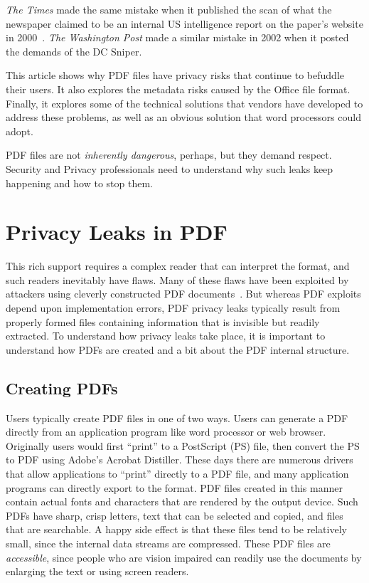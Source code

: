 \emph{The Times}  made the
same mistake when it published the scan of what the newspaper claimed
to be an internal US intelligence report on the paper's website in
2000~\cite{nyt-unediting-2003}. \emph{The Washington Post} made a
similar mistake in 2002 when it posted the demands of the DC
Sniper\cite{internet-forensics}.

This article shows
why PDF files have privacy risks that continue to befuddle their
users. It also explores the
metadata risks caused by the Office file format. Finally, it explores
some of the technical solutions that vendors have developed to address
these problems, as well as an obvious solution that 
word processors could adopt.

PDF files are not \emph{inherently dangerous}, perhaps, but they
demand respect. Security and Privacy professionals need to
understand why such leaks keep happening and how to stop them.

\section{Privacy Leaks in PDF}

This rich support requires a complex reader that can interpret the
format, and such readers inevitably have flaws. Many of these flaws
have been exploited by attackers using cleverly constructed
PDF documents~\cite{5705599}. But whereas PDF exploits depend upon
implementation errors, PDF privacy leaks typically result from
properly formed files  containing information that is invisible but
readily extracted. To understand how privacy leaks take place, it
is important to understand how PDFs are created and a bit
about the PDF internal structure.

\subsection{Creating PDFs}

Users typically create PDF files in one of two ways. Users can
generate a PDF directly from an application program like word
processor or web browser.  Originally users would first ``print'' to a
PostScript (PS) file, then convert the PS to PDF using Adobe's
Acrobat Distiller. These days there are numerous drivers that allow
applications to ``print'' directly to a PDF file, and many application
programs can directly export to the format. PDF files created in this
manner contain actual fonts and characters that are rendered by the
output device. Such PDFs have sharp, crisp letters, text that can be
selected and copied, and files that are searchable. A happy side
effect is that these files tend to be relatively small, since the
internal data streams are compressed. These PDF files are 
\emph{accessible}, since people who are vision impaired can readily use
the documents by enlarging the text or using screen readers.

